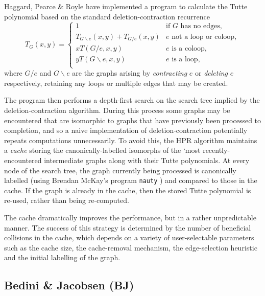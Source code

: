 Haggard, Pearce \& Royle have implemented a program to calculate the Tutte polynomial based on the standard  deletion-contraction recurrence
\[
T_G(x,y) = 
\begin{cases}
1 & \text{if $G$ has no edges},\\
T_{G \backslash e}(x,y) + T_{G/e} (x,y) & e \text{ not a loop or coloop},\\
x T(G/e, x, y) & e \text{ is a coloop,}\\
y T(G\backslash e, x, y) & e \text{ is a loop,}\\
\end{cases}
\]
where $G/e$ and $G\backslash e$ are the graphs arising by {\em contracting} $e$ or {\em deleting} $e$ respectively, retaining any loops or multiple edges that may be created. 

The program then performs a depth-first search on the search tree implied by the deletion-contraction algorithm. During this process some graphs may be encountered that are isomorphic to graphs that have previously been processed to completion, and so a naive implementation of deletion-contraction
potentially repeats computations unnecessarily. To avoid this, the HPR algorithm maintains a {\em cache} storing the canonically-labelled isomorphs of the 	`most recently-encountered intermediate graphs along with their Tutte polynomials. At every node of the search tree, the graph currently being processed is canonically labelled (using Brendan McKay's program \verb+nauty+  \cite{MR3131381}) and compared to those in the cache. If the graph is already in the cache, then the stored Tutte polynomial is re-used, rather than being re-computed.

The cache dramatically improves the performance, but in a rather unpredictable manner. The success of this strategy is determined by the number of beneficial collisions in the cache, which depends on a variety of user-selectable parameters such as the cache size, the cache-removal mechanism, the edge-selection heuristic and the initial labelling of the graph. 

\subsection{Bedini \& Jacobsen (BJ)}

